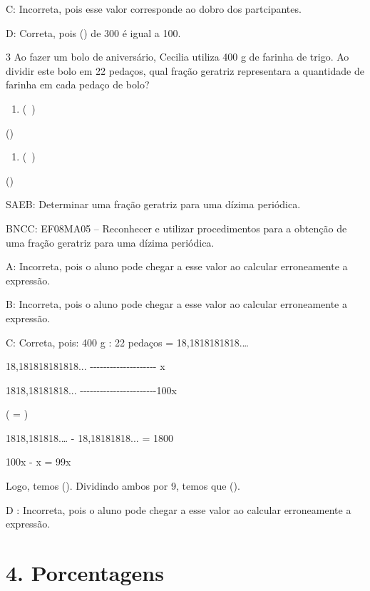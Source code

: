 C: Incorreta, pois esse valor corresponde ao dobro dos partcipantes.

D: Correta, pois () de 300 é igual a 100.

\num{3} Ao fazer um bolo de aniversário, Cecilia utiliza 400 g de farinha de
trigo. Ao dividir este bolo em 22 pedaços, qual fração geratriz
representara a quantidade de farinha em cada pedaço de bolo?

\begin{enumerate}
\def\labelenumi{\alph{enumi})}
\tightlist
\item
  (\ )
\end{enumerate}
\item ()

\begin{enumerate}
\def\labelenumi{\alph{enumi})}
\setcounter{enumi}{2}
\tightlist
\item
  (\ )
\end{enumerate}
\item ()

SAEB: Determinar uma fração geratriz para uma dízima periódica.

BNCC: EF08MA05 -- Reconhecer e utilizar procedimentos para a obtenção de
uma fração geratriz para uma dízima periódica.

A: Incorreta, pois o aluno pode chegar a esse valor ao calcular
erroneamente a expressão.

B: Incorreta, pois o aluno pode chegar a esse valor ao calcular
erroneamente a expressão.

C: Correta, pois: 400 g : 22 pedaços = 18,1818181818.\ldots{}

18,181818181818...
-\/-\/-\/-\/-\/-\/-\/-\/-\/-\/-\/-\/-\/-\/-\/-\/-\/-\/-\/- x

1818,18181818...
-\/-\/-\/-\/-\/-\/-\/-\/-\/-\/-\/-\/-\/-\/-\/-\/-\/-\/-\/-\/-\/-\/-100x

( = )

1818,181818.\ldots{} - 18,18181818... = 1800

100x - x = 99x

Logo, temos (). Dividindo ambos por 9, temos que
().

D : Incorreta, pois o aluno pode chegar a esse valor ao calcular
erroneamente a expressão.


\section{4. Porcentagens}


